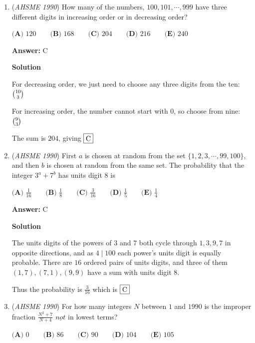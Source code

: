 \begin{enumerate}
 A)(13.12)/2 =78

 B)13

 subtracting these two cases from 325, we get 234, so the answer is 234

 


	\item (\textit{AHSME 1990}) How many of the numbers, $100,101,\cdots,999$ have three different digits in increasing order or in decreasing order?


 $\textbf{(A) } 120\qquad \textbf{(B) } 168\qquad \textbf{(C) } 204\qquad \textbf{(D) } 216\qquad \textbf{(E) } 240$

 \textbf{Answer: }C



\textbf{Solution}

For decreasing order, we just need to choose any three digits from the ten: $\tbinom{10}3$

 For increasing order, the number cannot start with $0$, so choose from nine: $\tbinom93$

 The sum is $204$, giving $\fbox{C}$



	\item (\textit{AHSME 1990}) First $a$ is chosen at random from the set $\{1,2,3,\cdots,99,100\}$, and then $b$ is chosen at random from the same set. The probability that the integer $3^a+7^b$ has units digit $8$ is


 $\textbf{(A) } \frac{1}{16}\qquad \textbf{(B) } \frac{1}{8}\qquad \textbf{(C) } \frac{3}{16}\qquad \textbf{(D) } \frac{1}{5}\qquad \textbf{(E) } \frac{1}{4}$

 \textbf{Answer: }C



\textbf{Solution}

The units digits of the powers of $3$ and $7$ both cycle through $1,3,9,7$ in opposite directions, and as $4\mid 100$ each power's units digit is equally probable. There are $16$ ordered pairs of units digits, and three of them $(1,7),(7,1),(9,9)$ have a sum with units digit $8$.

 Thus the probability is $\frac3{16}$ which is $\fbox{C}$



	\item (\textit{AHSME 1990}) For how many integers $N$ between $1$ and $1990$ is the improper fraction $\frac{N^2+7}{N+4}$ $\underline{not}$ in lowest terms?


 $\textbf{(A) } 0\qquad \textbf{(B) } 86\qquad \textbf{(C) } 90\qquad \textbf{(D) } 104\qquad \textbf{(E) } 105$


\end{enumerate}
